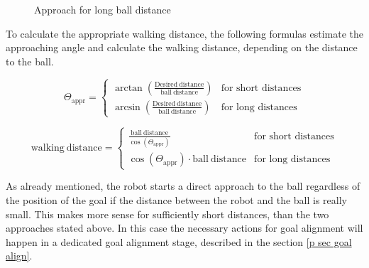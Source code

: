\begin{figure}[ht]
  \centering
  \caption{Approach for long ball distance}
  \label{j figure bdist hypo}
\end{figure}

To calculate the appropriate walking distance, the following formulas estimate
the approaching angle and calculate the walking distance, depending on the distance to the ball. 

\begin{equation}
\Theta_\mathrm{appr} =
\begin{cases}
\arctan\left(\frac{\mathrm{Desired\ distance}}{\mathrm{ball\ distance}} \right) & \text{for short distances}\\
\arcsin\left(\frac{\mathrm{Desired\ distance}}{\mathrm{ball\ distance}}\right) & \text{for long distances}
\end{cases}
\end{equation}

\begin{equation}
\mathrm{walking\ distance} =
\begin{cases}
\frac{\mathrm{ball\ distance}}{\cos(\Theta_\mathrm{appr})} & \text{for short distances}\\
\cos(\Theta_\mathrm{appr}) \cdot \mathrm{ball\ distance} & \text{for long distances}
\end{cases}
\end{equation}

As already mentioned, the robot starts a direct approach to the ball regardless of the position of the goal if the distance between the robot and the ball is really small.
This makes more sense for sufficiently short distances, than the two approaches stated
above. In this case the necessary actions for goal alignment will happen in a
dedicated goal alignment stage, described in the section \ref{p sec goal
  align}.
